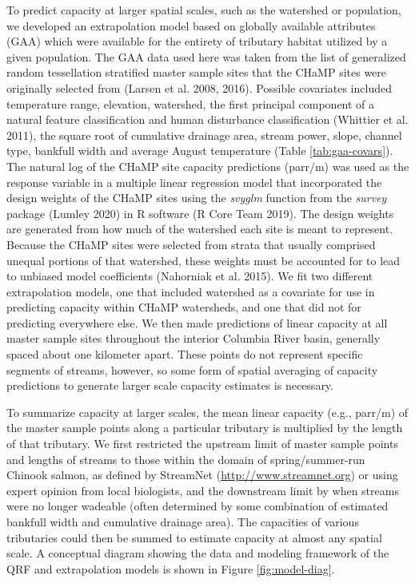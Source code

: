 \documentclass[
  12pt,
]{article}
\begin{document}
To predict capacity at larger spatial scales, such as the watershed or population, we developed an extrapolation model based on globally available attributes (GAA) which were available for the entirety of tributary habitat utilized by a given population. The GAA data used here was taken from the list of generalized random tessellation stratified master sample sites that the CHaMP sites were originally selected from (Larsen et al. 2008, 2016). Possible covariates included temperature range, elevation, watershed, the first principal component of a natural feature classification and human disturbance classification (Whittier et al. 2011), the square root of cumulative drainage area, stream power, slope, channel type, bankfull width and average August temperature (Table \ref{tab:gaa-covars}). The natural log of the CHaMP site capacity predictions (parr/m) was used as the response variable in a multiple linear regression model that incorporated the design weights of the CHaMP sites using the \emph{svyglm} function from the \emph{survey} package (Lumley 2020) in R software (R Core Team 2019). The design weights are generated from how much of the watershed each site is meant to represent. Because the CHaMP sites were selected from strata that usually comprised unequal portions of that watershed, these weights must be accounted for to lead to unbiased model coefficients (Nahorniak et al. 2015). We fit two different extrapolation models, one that included watershed as a covariate for use in predicting capacity within CHaMP watersheds, and one that did not for predicting everywhere else. We then made predictions of linear capacity at all master sample sites throughout the interior Columbia River basin, generally spaced about one kilometer apart. These points do not represent specific segments of streams, however, so some form of spatial averaging of capacity predictions to generate larger scale capacity estimates is necessary.

To summarize capacity at larger scales, the mean linear capacity (e.g., parr/m) of the master sample points along a particular tributary is multiplied by the length of that tributary. We first restricted the upstream limit of master sample points and lengths of streams to those within the domain of spring/summer-run Chinook salmon, as defined by StreamNet (\url{http://www.streamnet.org}) or using expert opinion from local biologists, and the downstream limit by when streams were no longer wadeable (often determined by some combination of estimated bankfull width and cumulative drainage area). The capacities of various tributaries could then be summed to estimate capacity at almost any spatial scale. A conceptual diagram showing the data and modeling framework of the QRF and extrapolation models is shown in Figure \ref{fig:model-diag}.
\end{document}
